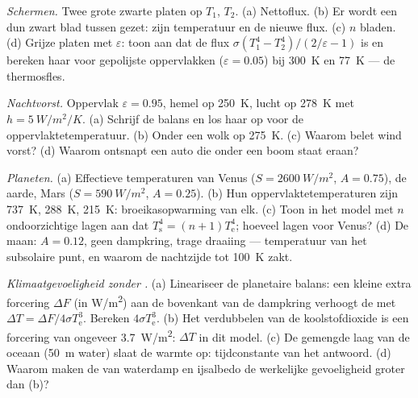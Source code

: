 \begin{exercise}[$\star\star$]\label{exo:b2:thermal-radiation:8}
\emph{Schermen.} Twee grote zwarte platen op $T_1$, $T_2$. (a) Nettoflux.
(b) Er wordt een dun zwart blad tussen gezet: zijn temperatuur en de
nieuwe flux. (c) $n$ bladen. (d) Grijze platen met  $\varepsilon$:
toon aan dat de flux $\sigma(T_1^4 - T_2^4)/(2/\varepsilon - 1)$ is en bereken
haar voor gepolijste oppervlakken ($\varepsilon = 0.05$) bij \qty{300}{K} en
\qty{77}{K} --- de thermosfles.
\end{exercise}

\begin{exercise}[$\star\star$]\label{exo:b2:thermal-radiation:9}
\emph{Nachtvorst.} Oppervlak $\varepsilon = 0.95$, hemel op \qty{250}{K}, lucht op
\qty{278}{K} met $h = \qty{5}{W/m^2/K}$. (a) Schrijf de balans en los haar op
voor de oppervlaktetemperatuur. (b) Onder een wolk op \qty{275}{K}. (c) Waarom
belet wind vorst? (d) Waarom ontsnapt een auto die onder een boom staat eraan?
\end{exercise}

\begin{exercise}[$\star\star\star$]\label{exo:b2:thermal-radiation:10}
\emph{Planeten.} (a) Effectieve temperaturen van Venus ($S = \qty{2600}{W/m^2}$,
$A = 0.75$), de aarde, Mars ($S = \qty{590}{W/m^2}$, $A = 0.25$). (b) Hun
oppervlaktetemperaturen zijn \qty{737}{K}, \qty{288}{K}, \qty{215}{K}:
broeikasopwarming van elk. (c) Toon in het model met $n$ ondoorzichtige lagen
aan dat $T_{\text{s}}^4 = (n + 1)T_{\text{e}}^4$; hoeveel lagen voor Venus?
(d) De maan: $A = 0.12$, geen dampkring, trage draaiing --- temperatuur
van het subsolaire punt, en waarom de nachtzijde tot \qty{100}{K} zakt.
\end{exercise}

\begin{exercise}[$\star\star\star$]\label{exo:b2:thermal-radiation:11}
\emph{Klimaatgevoeligheid zonder .} (a) Lineariseer de
planetaire balans: een kleine extra forcering $\Delta F$ (in \unit{W/m^2}) aan
de bovenkant van de dampkring verhoogt de  met
$\Delta T
= \Delta F/4\sigma T_{\text{e}}^3$. Bereken
$4\sigma T_{\text{e}}^3$. (b)
Het verdubbelen van de koolstofdioxide is een forcering van ongeveer
\qty{3.7}{W/m^2}:
$\Delta T$ in dit model. (c) De gemengde laag van de oceaan (\qty{50}{m}
water) slaat de warmte op: tijdconstante van het antwoord. (d) Waarom maken de
 van waterdamp en ijsalbedo de werkelijke gevoeligheid groter
dan (b)?
\end{exercise}

